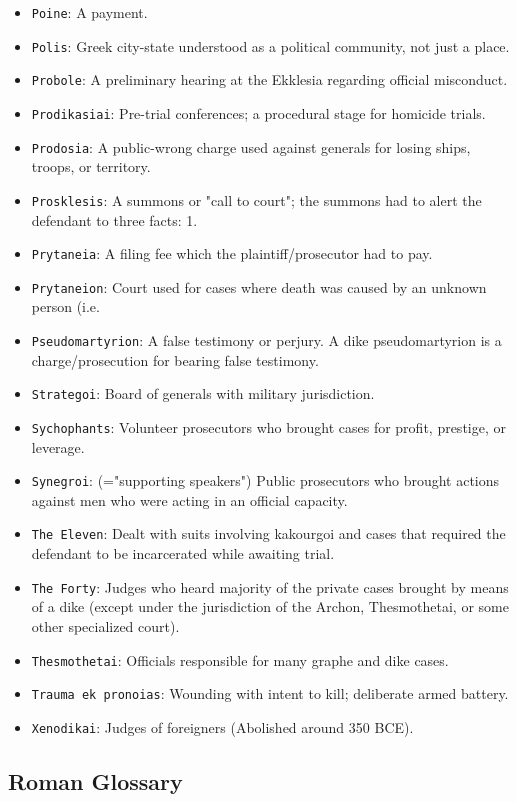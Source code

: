 \documentclass[11pt]{article}
\begin{document}
\begin{itemize}
\item \texttt{Poine}: A payment.
\item \texttt{Polis}: Greek city-state understood as a political community, not just a place.
\item \texttt{Probole}: A preliminary hearing at the Ekklesia regarding official misconduct.
\item \texttt{Prodikasiai}: Pre-trial conferences; a procedural stage for homicide trials.
\item \texttt{Prodosia}: A public-wrong charge used against generals for losing ships, troops, or territory.
\item \texttt{Prosklesis}: A summons or "call to court"; the summons had to alert the defendant to three facts: 1.
\item \texttt{Prytaneia}: A filing fee which the plaintiff/prosecutor had to pay.
\item \texttt{Prytaneion}: Court used for cases where death was caused by an unknown person (i.e.
\item \texttt{Pseudomartyrion}: A false testimony or perjury. A dike pseudomartyrion is a charge/prosecution for bearing false testimony.
\item \texttt{Strategoi}: Board of generals with military jurisdiction.
\item \texttt{Sychophants}: Volunteer prosecutors who brought cases for profit, prestige, or leverage.
\item \texttt{Synegroi}: (="supporting speakers") Public prosecutors who brought actions against men who were acting in an official capacity.
\item \texttt{The Eleven}: Dealt with suits involving kakourgoi and cases that required the defendant to be incarcerated while awaiting trial.
\item \texttt{The Forty}: Judges who heard majority of the private cases brought by means of a dike (except under the jurisdiction of the Archon, Thesmothetai, or some other specialized court).
\item \texttt{Thesmothetai}: Officials responsible for many graphe and dike cases.
\item \texttt{Trauma ek pronoias}: Wounding with intent to kill; deliberate armed battery.
\item \texttt{Xenodikai}: Judges of foreigners (Abolished around 350 BCE).
\end{itemize}

\subsection{Roman Glossary}
\end{document}
